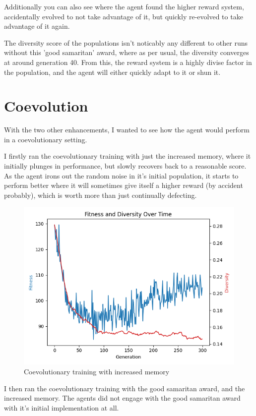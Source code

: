 \documentclass[11pt]{scrartcl} %
\begin{document}
Additionally you can also see where the agent found the higher reward system, accidentally evolved to not take advantage of it, but quickly re-evolved to take advantage of it again.

The diversity score of the populations isn't noticably any different to other runs without this 'good samaritan' award, where as per usual, the diversity converges at around generation 40.
From this, the reward system is a highly divise factor in the population, and the agent will either quickly adapt to it or shun it.


\section{Coevolution}
With the two other enhancements, I wanted to see how the agent would perform in a coevolutionary setting.

I firstly ran the coevolutionary training with just the increased memory, where it initially plunges in performance, but slowly recovers back to a reasonable score.
As the agent irons out the random noise in it's initial population, it starts to perform better where it will sometimes give itself a higher reward (by accident probably), which is worth more than just continually defecting.

\begin{figure}[H]
	\centering
	\includegraphics[width=0.8\linewidth]{Figures/part_2/no_good_sam_coev/300.png}
	\caption{Coevolutionary training with increased memory}
	\label{fig:300_gen_mem_coev}
\end{figure}

I then ran the coevolutionary training with the good samaritan award, and the increased memory.
The agents did not engage with the good samaritan award with it's initial implementation at all.
\end{document}
